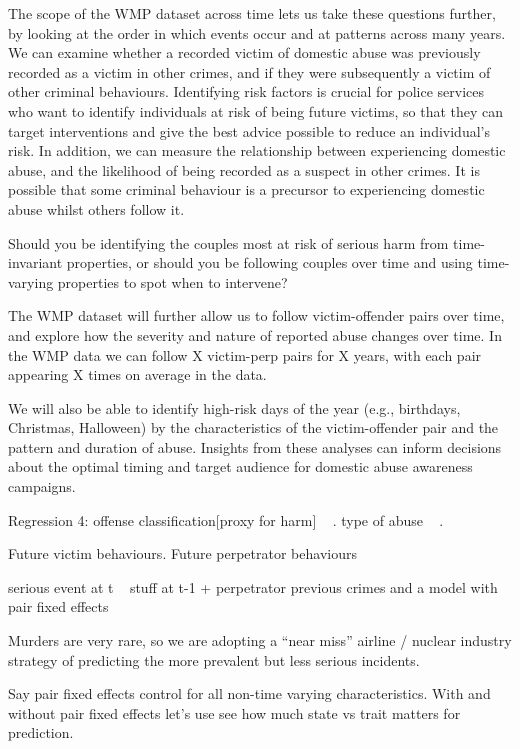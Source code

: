\documentclass[11pt, a4paper]{article}
\begin{document}
The scope of the WMP dataset across time lets us take these questions further, by looking at the order in which events occur and at patterns across many years. We can examine whether a recorded victim of domestic abuse was previously recorded as a victim in other crimes, and if they were subsequently a victim of other criminal behaviours. Identifying risk factors is crucial for police services who want to identify individuals at risk of being future victims, so that they can target interventions and give the best advice possible to reduce an individual's risk. In addition, we can measure the relationship between experiencing domestic abuse, and the likelihood of being recorded as a suspect in other crimes. It is possible that some criminal behaviour is a precursor to experiencing domestic abuse whilst others follow it. 

Should you be identifying the couples most at risk of serious harm from time-invariant properties, or should you be following couples over time and using time-varying properties to spot when to intervene? 

The WMP dataset will further allow us to follow victim-offender pairs over time, and explore how the severity and nature of reported abuse changes over time. 
In the WMP data we can follow X victim-perp pairs for X years, with each pair appearing X times on average in the data.

We will also be able to identify high-risk days of the year (e.g., birthdays, Christmas, Halloween) by the characteristics of the victim-offender pair and the pattern and duration of abuse. Insights from these analyses can inform decisions about the optimal timing and target audience for domestic abuse awareness campaigns. 

Regression 4: offense classification[proxy for harm] ~ .
	type of abuse ~ .

Future victim behaviours. Future perpetrator behaviours

serious event at t ~ stuff at t-1  + perpetrator previous crimes
 and 	a model with pair fixed effects

Murders are very rare, so we are adopting a ``near miss'' airline / nuclear industry strategy of predicting the more prevalent but less serious incidents. 

Say pair fixed effects control for all non-time varying characteristics. With and without pair fixed effects let's use see how much state vs trait matters for prediction. 
\end{document}
